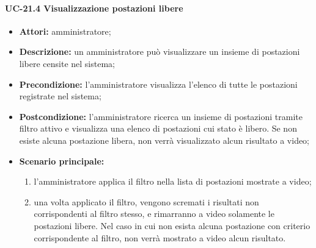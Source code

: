 \paragraph{UC-21.4 Visualizzazione postazioni libere}
\begin{itemize}
    \item \textbf{Attori:} amministratore;
    \item \textbf{Descrizione:} un amministratore pu\`{o} visualizzare un insieme di postazioni libere censite nel sistema;
    \item \textbf{Precondizione:} l'amministratore visualizza l'elenco di tutte le postazioni registrate nel sistema;
    \item \textbf{Postcondizione:} l'amministratore ricerca un insieme di postazioni tramite filtro attivo e visualizza una elenco di postazioni cui stato è libero. Se non esiste alcuna postazione libera, non verrà visualizzato alcun risultato a video;
    \item \textbf{Scenario principale:}
    \begin{enumerate}
        \item l'amministratore applica il filtro nella lista di postazioni mostrate a video;
        \item una volta applicato il filtro, vengono scremati i risultati non corrispondenti al filtro stesso, e rimarranno a video solamente le postazioni libere. Nel caso in cui non esista alcuna postazione con criterio corrispondente al filtro, non verrà mostrato a video alcun risultato.
    \end{enumerate}
\end{itemize}

